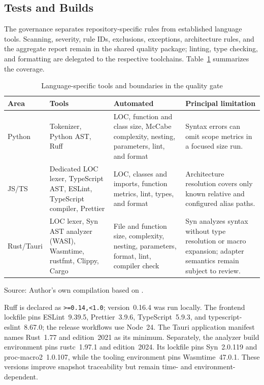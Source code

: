 \subsection{Tests and Builds}
\label{subsec:tests-builds}

The governance separates repository-specific rules from established language
tools. Scanning, severity, rule IDs, exclusions, exceptions, architecture
rules, and the aggregate report remain in the shared quality package; linting,
type checking, and formatting are delegated to the respective toolchains.
Table~\ref{tab:quality-language-tools} summarizes the coverage.

\begin{table}[H]
  \centering
  \scriptsize
  \renewcommand{\arraystretch}{1.08}
  \caption{Language-specific tools and boundaries in the quality gate}
  \label{tab:quality-language-tools}
  \begin{tabularx}{\textwidth}{@{}p{}p{}>{\raggedright\arraybackslash}X p{}@{}}
    \toprule
    \textbf{Area} & \textbf{Tools} & \textbf{Automated} &
      \textbf{Principal limitation} \\
    \midrule
    Python & Tokenizer, Python AST, Ruff & LOC, function and class size,
      McCabe complexity, nesting, parameters, lint, and format & Syntax errors
      can omit scope metrics in a focused size run. \\
    JS/TS & Dedicated LOC lexer, TypeScript AST, ESLint, TypeScript compiler,
      Prettier & LOC, classes and imports, function metrics, lint, types, and
      format & Architecture resolution covers only known relative and configured
      alias paths. \\
    Rust/Tauri & LOC lexer, Syn AST analyzer (WASI), Wasmtime, rustfmt,
      Clippy, Cargo & File and function size, complexity, nesting, parameters,
      format, lint, compiler check & Syn analyzes syntax without type resolution
      or macro expansion; adapter semantics remain subject to review. \\
    \bottomrule
  \end{tabularx}
  \smallskip
  {\footnotesize Source: Author's own compilation based on
  \textcite{kleiveist2026quality-implementation}.\par}
\end{table}

Ruff is declared as \texttt{>=0.14,<1.0}; version~0.16.4 was run locally. The
frontend lockfile pins ESLint~9.39.5, Prettier~3.9.6, TypeScript~5.9.3, and
typescript-eslint~8.67.0; the release workflows use Node~24. The Tauri
application manifest names Rust~1.77 and edition~2021 as its minimum. Separately,
the analyzer build environment pins rustc~1.97.1 and edition~2024. Its lockfile
pins Syn~2.0.119 and proc-macro2~1.0.107, while the tooling environment pins
Wasmtime~47.0.1. These versions improve snapshot traceability but remain time-
and environment-dependent.

